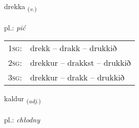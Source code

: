 \documentclass[frontgrid, backgrid]{flacards}\usepackage[]{graphicx}\usepackage[]{xcolor}
\begin{document}
\renewcommand{\flhead}{\vskip5pt \fboxsep=0pt {\small\bfseries\footnotesize Sagnorð | czasownik}}
\renewcommand{\fcfoot}{\vskip5pt \fboxsep=0pt \hspace{2pt}{\small\bfseries\footnotesize 1K}}

\renewcommand{\blhead}{\vskip5pt {\small\bfseries\footnotesize Sagnorð | czasownik }}
\renewcommand{\bcfoot}{\vskip5pt \hspace{2pt}{\small\bfseries\footnotesize 1K}}


{drekka \small{\textsubscript{(\textit{v.})}} \\[1ex] %
\textphonetic{[trɛhka]} \\
pl.: \emph{pić} \\  [2ex]
\renewcommand*{\arraystretch}{0.8}
\begin{tabular}{p{1cm}l}
\textsc{1sg}: & drekk -- drakk -- drukkið \\ 
\textsc{2sg}: & drekkur -- drakkst -- drukkið \\ 
\textsc{3sg}: & drekkur -- drakk -- drukkið \\ 
\end{tabular}
}

\renewcommand{\flhead}{\vskip5pt \fboxsep=0pt {\small\bfseries\footnotesize Lýsingarorð | przymiotnik}}
\renewcommand{\fcfoot}{\vskip5pt \fboxsep=0pt \hspace{2pt}{\small\bfseries\footnotesize 1K}}

\renewcommand{\blhead}{\vskip5pt {\small\bfseries\footnotesize Lýsingarorð | przymiotnik }}
\renewcommand{\bcfoot}{\vskip5pt \hspace{2pt}{\small\bfseries\footnotesize 1K}}


{kaldur \small{\textsubscript{(\textit{adj.})}} \\[1ex] %
\textphonetic{[kʰaltʏr]} \\
pl.: \emph{chłodny} \\  [2ex]
\renewcommand*{\arraystretch}{0.8}
}
\end{document}

